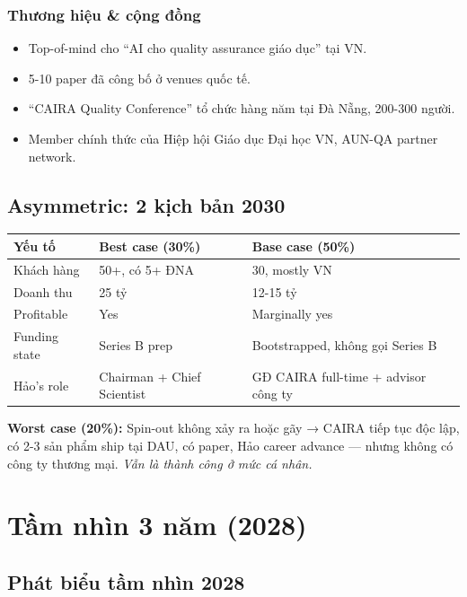 \documentclass[11pt,a4paper]{article}
\begin{document}
\subsubsection*{Thương hiệu \& cộng đồng}

\begin{itemize}
\item Top-of-mind cho ``AI cho quality assurance giáo dục'' tại VN.
\item 5-10 paper đã công bố ở venues quốc tế.
\item ``CAIRA Quality Conference'' tổ chức hàng năm tại Đà Nẵng, 200-300 người.
\item Member chính thức của Hiệp hội Giáo dục Đại học VN, AUN-QA partner network.
\end{itemize}

\subsection{Asymmetric: 2 kịch bản 2030}

\begin{tabularx}{\linewidth}{@{}p{3cm} X X@{}}
\toprule
\textbf{Yếu tố} & \textbf{Best case (30\%)} & \textbf{Base case (50\%)} \\
\midrule
Khách hàng & 50+, có 5+ ĐNA & 30, mostly VN \\
Doanh thu & 25 tỷ & 12-15 tỷ \\
Profitable & Yes & Marginally yes \\
Funding state & Series B prep & Bootstrapped, không gọi Series B \\
Hảo's role & Chairman + Chief Scientist & GĐ CAIRA full-time + advisor công ty \\
\bottomrule
\end{tabularx}

\textbf{Worst case (20\%):} Spin-out không xảy ra hoặc gãy → CAIRA tiếp tục độc
lập, có 2-3 sản phẩm ship tại DAU, có paper, Hảo career advance --- nhưng
không có công ty thương mại. \emph{Vẫn là thành công ở mức cá nhân.}

\clearpage

\section{Tầm nhìn 3 năm (2028)}

\subsection{Phát biểu tầm nhìn 2028}
\end{document}
